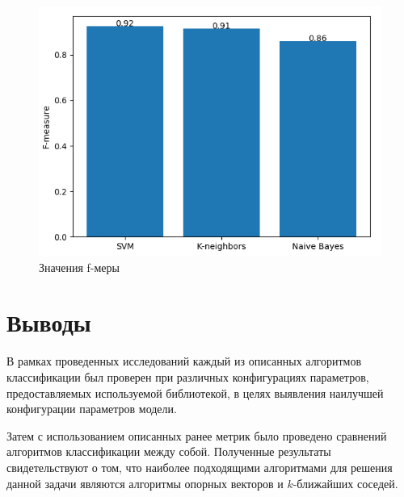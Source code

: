 \newpage
\begin{figure}[h!]
	\centering
	\includegraphics[scale=0.7]{inc/img/f1.png}
	\caption{Значения f-меры}
	\label{res:f1}
\end{figure}

\newpage
\section{Выводы}

В рамках проведенных исследований каждый из описанных алгоритмов классификации был проверен при различных конфигурациях параметров, предоставляемых используемой библиотекой, в целях выявления наилучшей конфигурации параметров модели.

Затем с использованием описанных ранее метрик было проведено сравнений алгоритмов классификации между собой. Полученные результаты свидетельствуют о том, что наиболее подходящими алгоритмами для решения данной задачи являются алгоритмы опорных векторов и $k$-ближайших соседей.


